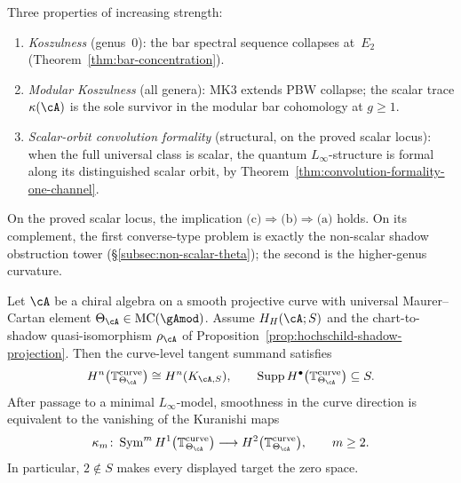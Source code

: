 \begin{remark}
\label{rem:formality-vs-koszul}
Three properties of increasing strength:
\begin{enumerate}[label=\textup{(\alph*)}]
\item \emph{Koszulness} (genus~$0$): the bar spectral sequence
 collapses at~$E_2$
 (Theorem~\ref{thm:bar-concentration}).

\item \emph{Modular Koszulness} (all genera): MK3 extends PBW
 collapse; the scalar trace $\kappa(\cA)$ is the sole survivor
 in the modular bar cohomology at $g \geq 1$.

\item \emph{Scalar-orbit convolution formality} (structural, on the
 proved scalar locus): when the full universal class is scalar,
 the quantum $L_\infty$-structure is formal along its
 distinguished scalar orbit, by
 Theorem~\ref{thm:convolution-formality-one-channel}.
\end{enumerate}
On the proved scalar locus, the implication
$\text{(c)} \Rightarrow \text{(b)} \Rightarrow \text{(a)}$
holds. On its complement, the first converse-type problem is
exactly the non-scalar shadow obstruction tower
(\S\ref{subsec:non-scalar-theta}); the second is the
higher-genus curvature.
\end{remark}

\begin{proposition}
\label{prop:mc-tangent-amplitude}
Let \(\cA\) be a chiral algebra on a smooth projective curve with
universal Maurer--Cartan element
\(\Theta_\cA\in\operatorname{MC}(\gAmod)\).  Assume
\(H_H(\cA;S)\) and the chart-to-shadow quasi-isomorphism
\(\rho_\cA\) of Proposition~\ref{prop:hochschild-shadow-projection}.
Then the curve-level tangent summand satisfies
\[
 H^n\bigl(\mathbb T^{\mathrm{curve}}_{\Theta_\cA}\bigr)
 \cong H^n(K_{\cA,S}),
 \qquad
 \operatorname{Supp}
 H^\bullet\bigl(\mathbb T^{\mathrm{curve}}_{\Theta_\cA}\bigr)
 \subseteq S.
\]
After passage to a minimal \(L_\infty\)-model, smoothness in the curve
direction is equivalent to the vanishing of the Kuranishi maps
\begin{equation}\label{eq:mc-smoothness}
 \kappa_m\colon
 \operatorname{Sym}^m
 H^1\bigl(\mathbb T^{\mathrm{curve}}_{\Theta_\cA}\bigr)
 \longrightarrow
 H^2\bigl(\mathbb T^{\mathrm{curve}}_{\Theta_\cA}\bigr),
 \qquad m\geq2.
\end{equation}
In particular, \(2\notin S\) makes every displayed target the zero
space.
\end{proposition}

